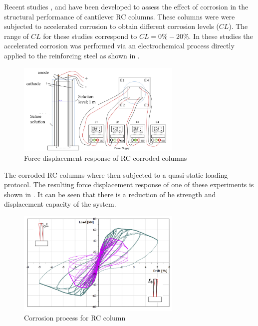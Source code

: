 Recent studies \cite{Ma2012}, \cite{Meda2014} and \cite{Yang2016} have been developed to assess the effect of corrosion in the structural performance of cantilever RC columns. These columns were were subjected to accelerated corrosion to obtain different corrosion levels ($CL$). The range of $CL$ for these studies correspond to $CL=0\%-20\%$. In these studies the accelerated corrosion was performed via an electrochemical process directly applied to the reinforcing steel as shown in .

\begin{figure}[htbp]
	\centering
	\includegraphics[width=0.7\textwidth]{Chapter-3/figs/Meda_Corrosion}
	\caption{Force displacement response of RC corroded columns \cite{Meda2014}}
	\label{fig:Meda_RC_CorrosionProc}
\end{figure}

The corroded RC columns where then subjected to a quasi-static loading protocol. The resulting force displacement response of one of these experiments is shown in . It can be seen that there is a reduction of he strength and displacement capacity of the system. 

\begin{figure}[htbp]
	\centering
	\includegraphics[width=0.7\textwidth]{Chapter-3/figs/Meda_F-D_01}
	\caption{Corrosion process for RC column \cite{Meda2014}}
	\label{fig:Meda_FD}
\end{figure}

